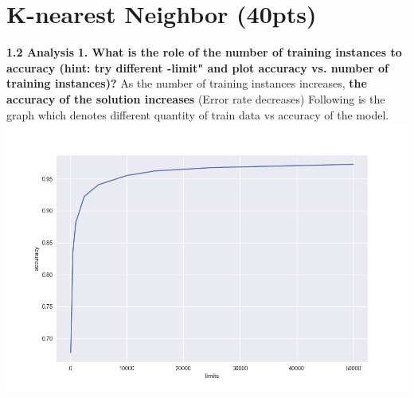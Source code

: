 \documentclass[11pt]{article}
\begin{document}
\thispagestyle{empty}

\newlength{\boxlength}\setlength{\boxlength}{\textwidth}
\addtolength{\boxlength}{-4mm}

\begin{center}
\end{center}




\section{K-nearest Neighbor (40pts)}
\textbf{1.2 Analysis}\newline
\textbf{1. What is the role of the number of training instances to accuracy (hint: try different \--limit" and plot accuracy vs. number of training instances)?}\newline
\newline
As the number of training instances increases, \textbf{the accuracy of the solution increases} (Error rate decreases)\newline
Following is the graph which denotes different quantity of train data vs accuracy of the model.\newline
\includegraphics[width=\textwidth]{answer1.png}
\end{document}
